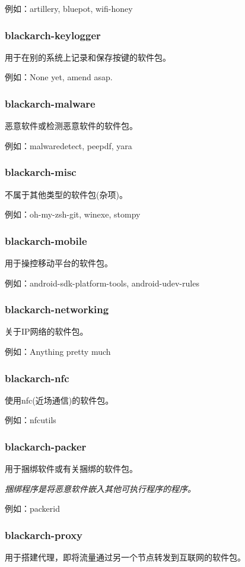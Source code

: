 \documentclass[a4paper, oneside, 11pt]{book}
\begin{document}
例如：artillery, bluepot, wifi-honey

\subsubsection{blackarch-keylogger}
用于在别的系统上记录和保存按键的软件包。

例如：None yet, amend asap.

\subsubsection{blackarch-malware}
恶意软件或检测恶意软件的软件包。

例如：malwaredetect, peepdf, yara

\subsubsection{blackarch-misc}

不属于其他类型的软件包(杂项)。

例如：oh-my-zsh-git, winexe, stompy

\subsubsection{blackarch-mobile}
用于操控移动平台的软件包。

例如：android-sdk-platform-tools, android-udev-rules

\subsubsection{blackarch-networking}
关于IP网络的软件包。

例如：Anything pretty much

\subsubsection{blackarch-nfc}
使用nfc(近场通信)的软件包。

例如：nfcutils

\subsubsection{blackarch-packer}
用于捆绑软件或有关捆绑的软件包。

\textit{捆绑程序是将恶意软件嵌入其他可执行程序的程序。}

例如：packerid

\subsubsection{blackarch-proxy}
用于搭建代理，即将流量通过另一个节点转发到互联网的软件包。
\end{document}
